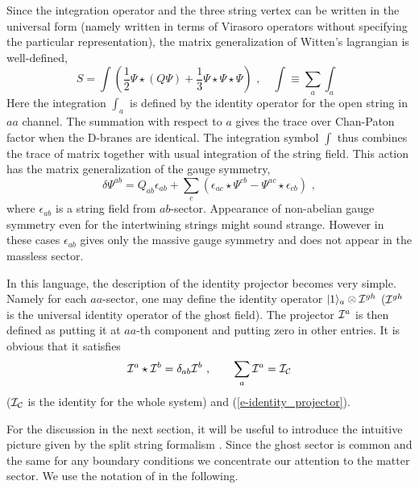 \documentclass[a4paper,12pt]{article}
\begin{document}
Since the integration operator and the three string vertex 
can be written in the universal form \cite{r-RZ} 
(namely written in terms of Virasoro operators without 
specifying the particular  representation), the matrix
generalization of Witten's lagrangian is well-defined,
\begin{equation}
 S=\int \left(\frac{1}{2}\Psi \star(Q \Psi) + 
\frac{1}{3} \Psi\star\Psi\star\Psi
\right)\,\,,\quad
\int\equiv \sum_a \int_a
\end{equation}
Here the integration $\int_a$
is defined by the identity operator for the open string
in $aa$ channel. The summation with respect to 
$a$ gives the trace over Chan-Paton factor
when the D-branes are identical. 
The integration symbol $\int$ thus combines the trace of
matrix together with usual integration of the string field.
This action has the matrix generalization of the gauge symmetry,
\begin{equation}
 \delta \Psi^{ab}=Q_{ab} \epsilon_{ab} 
 + \sum_c (\epsilon_{ac}\star \Psi^{cb}-
\Psi^{ac}\star\epsilon_{cb})\,\,,
\end{equation}
where $\epsilon_{ab}$ is a string field from $ab$-sector.
Appearance of non-abelian gauge symmetry even for 
the intertwining strings might sound strange.  
However in these cases
$\epsilon_{ab}$ gives only the massive gauge
symmetry and does not appear in the massless sector.

In this language, the description of the identity projector
becomes very simple.  Namely for each $aa$-sector, one may define
the identity operator $|1\rangle_a\otimes {\cal I}^{gh}$
(${\cal I}^{gh}$ is the universal identity operator of the ghost field).
The projector ${\cal I}^a$ is then
defined as putting it at $aa$-th component and putting zero
in other entries.  It is obvious that it satisfies 
\begin{equation}
 {\cal I}^a\star{\cal I}^b=\delta_{ab}{\cal I}^b\,\,,\qquad
 \sum_{a}{\cal I}^a={\cal I}_{{\cal C}}
\end{equation}
(${\cal I}_{\cal C}$ is the identity for the whole system) 
and (\ref{e-identity_projector}).

For the discussion in the next section, it will be
useful to introduce the intuitive picture given by
the split string formalism \cite{r-GT1, r-GT2,
r-KO, r-AAB}.  Since the ghost sector
is common and the same for any boundary conditions we
concentrate our attention to the matter sector. We use
the notation of \cite{r-GT1, r-GT2} in the following.
\end{document}
